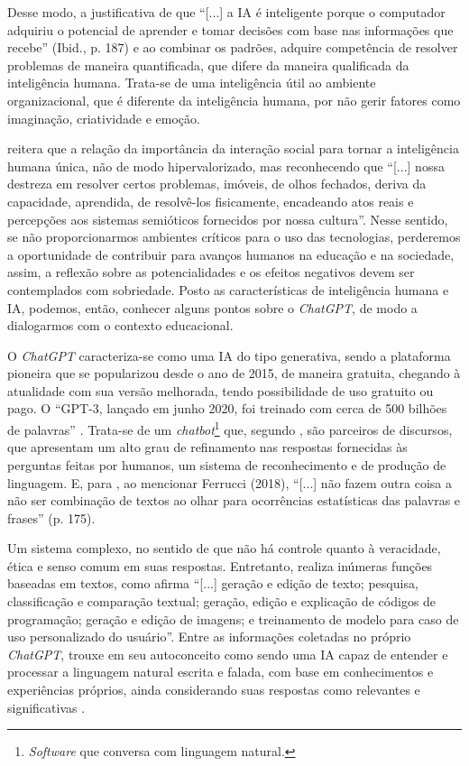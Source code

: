 \documentclass[portuguese]{textolivre}
\begin{document}
Desse modo, a justificativa de que “[...] a IA é inteligente porque o computador adquiriu o potencial de aprender e tomar decisões com base nas informações que recebe” (Ibid., p. 187) e ao combinar os padrões, adquire competência de resolver problemas de maneira quantificada, que difere da maneira qualificada da inteligência humana. Trata-se de uma inteligência útil ao ambiente organizacional, que é diferente da inteligência humana, por não gerir fatores como imaginação, criatividade e emoção.

\textcite[p. 97]{levy1993tecnologias} reitera que a relação da importância da interação social para tornar a inteligência humana única, não de modo hipervalorizado, mas reconhecendo que “[...] nossa destreza em resolver certos problemas, imóveis, de olhos fechados, deriva da capacidade, aprendida, de resolvê-los fisicamente, encadeando atos reais e percepções aos sistemas semióticos fornecidos por nossa cultura”. Nesse sentido, se não proporcionarmos ambientes críticos para o uso das tecnologias, perderemos a oportunidade de contribuir para avanços humanos na educação e na sociedade, assim, a reflexão sobre as potencialidades e os efeitos negativos devem ser contemplados com sobriedade. Posto as características de inteligência humana e IA, podemos, então, conhecer alguns pontos sobre o \emph{ChatGPT}, de modo a dialogarmos com o contexto educacional.

O \emph{ChatGPT} caracteriza-se como uma IA do tipo generativa, sendo a plataforma pioneira que se popularizou desde o ano de 2015, de maneira gratuita, chegando à atualidade com sua versão melhorada, tendo possibilidade de uso gratuito ou pago. O “GPT-3, lançado em junho 2020, foi treinado com cerca de 500 bilhões de palavras” \cite[p. 244]{2022kaufman}. Trata-se de um \emph{chatbot}\footnote{\emph{Software} que conversa com linguagem natural.} que, segundo \textcite{demoraes2023}, são parceiros de discursos, que apresentam um alto grau de refinamento nas respostas fornecidas às perguntas feitas por humanos, um sistema de reconhecimento e de produção de linguagem. E, para \textcite{santaella2023inteligencia}, ao mencionar Ferrucci (2018), “[...] não fazem outra coisa a não ser combinação de textos ao olhar para ocorrências estatísticas das palavras e frases” (p. 175). 

Um sistema complexo, no sentido de que não há controle quanto à veracidade, ética e senso comum em suas respostas. Entretanto, realiza inúmeras funções baseadas em textos, como afirma \textcite[p. 6]{demoraes2023} “[...] geração e edição de texto; pesquisa, classificação e comparação textual; geração, edição e explicação de códigos de programação; geração e edição de imagens; e treinamento de modelo para caso de uso personalizado do usuário”. Entre as informações coletadas no próprio \emph{ChatGPT}, trouxe em seu autoconceito como sendo uma IA capaz de entender e processar a linguagem natural escrita e falada, com base em conhecimentos e experiências próprios, ainda considerando suas respostas como relevantes e significativas \cite{demoraes2023}.
\end{document}
